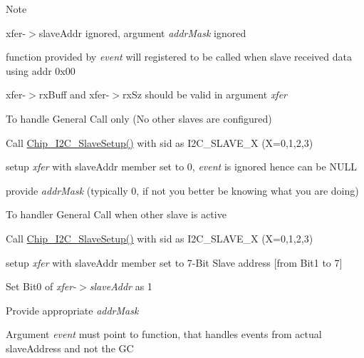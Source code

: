 \begin{DoxyNote}{Note}
\begin{DoxyItemize}
\begin{DoxyItemize}
\item xfer-\/$>$slave\-Addr ignored, argument {\itshape addr\-Mask} ignored
\item function provided by {\itshape event} will registered to be called when slave received data using addr 0x00
\item xfer-\/$>$rx\-Buff and xfer-\/$>$rx\-Sz should be valid in argument {\itshape xfer} 
\end{DoxyItemize}
\item To handle General Call only (No other slaves are configured)
\begin{DoxyItemize}
\item Call \hyperlink{group__I2C__17XX__40XX_gaf6ea40668dde26e406f76ff3ddeda527}{Chip\-\_\-\-I2\-C\-\_\-\-Slave\-Setup()} with sid as I2\-C\-\_\-\-S\-L\-A\-V\-E\-\_\-\-X (X=0,1,2,3)
\item setup {\itshape xfer} with slave\-Addr member set to 0, {\itshape event} is ignored hence can be N\-U\-L\-L
\item provide {\itshape addr\-Mask} (typically 0, if not you better be knowing what you are doing)
\end{DoxyItemize}
\item To handler General Call when other slave is active
\begin{DoxyItemize}
\item Call \hyperlink{group__I2C__17XX__40XX_gaf6ea40668dde26e406f76ff3ddeda527}{Chip\-\_\-\-I2\-C\-\_\-\-Slave\-Setup()} with sid as I2\-C\-\_\-\-S\-L\-A\-V\-E\-\_\-\-X (X=0,1,2,3)
\item setup {\itshape xfer} with slave\-Addr member set to 7-\/\-Bit Slave address \mbox{[}from Bit1 to 7\mbox{]}
\item Set Bit0 of {\itshape xfer-\/$>$slave\-Addr} as 1
\item Provide appropriate {\itshape addr\-Mask} 
\item Argument {\itshape event} must point to function, that handles events from actual slave\-Address and not the G\-C 
\end{DoxyItemize}
\end{DoxyItemize}
\end{DoxyNote}
